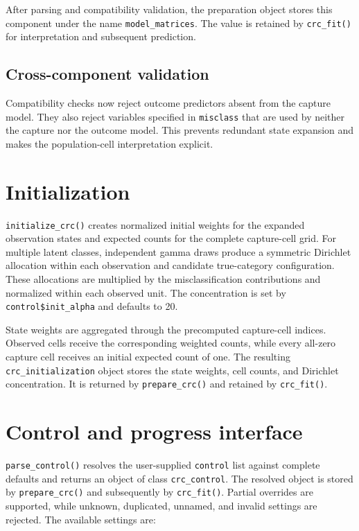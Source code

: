\documentclass[11pt,letterpaper]{article}
\begin{document}
After parsing and compatibility validation, the preparation object stores this
component under the name \texttt{model\_matrices}. The value is retained by
\texttt{crc\_fit()} for interpretation and subsequent prediction.

\subsection{Cross-component validation}

Compatibility checks now reject outcome predictors absent from the capture
model. They also reject variables specified in \texttt{misclass} that are used
by neither the capture nor the outcome model. This prevents redundant state
expansion and makes the population-cell interpretation explicit.

\newpage

\section{Initialization}

\texttt{initialize\_crc()} creates normalized initial weights for the expanded
observation states and expected counts for the complete capture-cell grid. For
multiple latent classes, independent gamma draws produce a symmetric
Dirichlet allocation within each observation and candidate true-category
configuration. These allocations are multiplied by the misclassification
contributions and normalized within each observed unit. The concentration is
set by \texttt{control\$init\_alpha} and defaults to 20.

State weights are aggregated through the precomputed capture-cell indices.
Observed cells receive the corresponding weighted counts, while every
all-zero capture cell receives an initial expected count of one. The resulting
\texttt{crc\_initialization} object stores the state weights, cell counts, and
Dirichlet concentration. It is returned by \texttt{prepare\_crc()} and retained
by \texttt{crc\_fit()}.

\section{Control and progress interface}

\texttt{parse\_control()} resolves the user-supplied \texttt{control} list
against complete defaults and returns an object of class
\texttt{crc\_control}. The resolved object is stored by
\texttt{prepare\_crc()} and subsequently by \texttt{crc\_fit()}. Partial
overrides are supported, while unknown, duplicated, unnamed, and invalid
settings are rejected. The available settings are:
\end{document}
